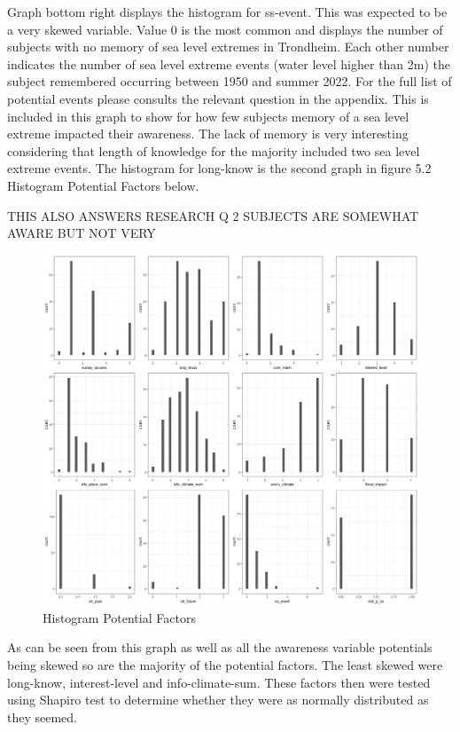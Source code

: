 Graph bottom right displays the histogram for ss-event. This was expected to be a very skewed variable. Value 0 is the most common and displays the number of subjects with no memory of sea level extremes in Trondheim. Each other number indicates the number of sea level extreme events (water level higher than 2m) the subject remembered occurring between 1950 and summer 2022. For the full list of potential events please consults the relevant question in the appendix. This is included in this graph to show for how few subjects memory of a sea level extreme impacted their awareness. The lack of memory is very interesting considering that length of knowledge for the majority included two sea level extreme events. The histogram for long-know is the second graph in figure 5.2 Histogram Potential Factors below.

THIS ALSO ANSWERS RESEARCH Q 2
SUBJECTS ARE SOMEWHAT AWARE BUT NOT VERY


\begin{figure}[h]
    \centering
    \includegraphics[width=1\textwidth]{fig_results/large_factors_all_histogram.png}
    \caption{Histogram Potential Factors}
    \label{fig:factors}
\end{figure}

As can be seen from this graph as well as all the awareness variable potentials being skewed so are the majority of the potential factors. The least skewed were long-know, interest-level and info-climate-sum. These factors then were tested using Shapiro test to determine whether they were as normally distributed as they seemed. 


